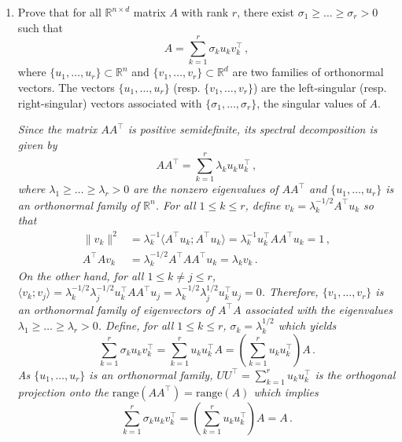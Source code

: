 \documentclass[a4paper,10pt,fleqn]{article}
\newcommand{\eqsp}{\,}
\newcommand{\rset}{\ensuremath{\mathbb{R}}}
\newcommand{\1}{\ensuremath{\mathbbm{1}}}
\newcommand{\bfU}{U}
\newcommand{\bfA}{A}
\newcommand{\bfV}{V}
\begin{document}
\begin{enumerate}
\item Prove that for all $\rset^{n \times d}$ matrix $\bfA$ with rank $r$, there exist $\sigma_1\geqslant \ldots \geqslant \sigma_r>0$ such that
$$
\bfA = \sum_{k=1}^r \sigma_k u_k v^\top_k\eqsp,
$$
where $\{u_1,\ldots,u_r\}\subset \rset^n$ and $\{v_1,\ldots,v_r \} \subset \rset^d$ are two families of orthonormal  vectors. The vectors $\{u_1,\ldots,u_r\}$  (resp. $\{v_1,\ldots,v_r\}$) are the left-singular (resp. right-singular) vectors associated with $\{\sigma_1,\ldots,\sigma_r\}$, the singular values of $\bfA$.

\vspace{.2cm}

{\em
Since the matrix $\bfA\bfA^\top$ is positive semidefinite, its spectral decomposition is given by
$$
\bfA\bfA^\top = \sum_{k=1}^r \lambda_k u_k u^\top_k\eqsp,
$$
where $\lambda_1\geqslant \ldots\geqslant \lambda_r>0$ are the nonzero eigenvalues of $\bfA\bfA^\top$ and $\{u_1,\ldots,u_r\}$ is an orthonormal family of $\rset^n$. For all $1\leqslant k\leqslant r$, define $v_k = \lambda_k^{-1/2}\bfA^\top u_k$ so that
\begin{align*}
\|v_k\|^2&=\lambda_k^{-1}\langle \bfA^\top u_k;\bfA^\top u_k\rangle = \lambda_k^{-1} u^\top_k\bfA\bfA^\top u_k = 1\eqsp, \\
\bfA^\top\bfA v_k & = \lambda_k^{-1/2}\bfA^\top \bfA \bfA^\top u_k  = \lambda_k v_k\eqsp.
\end{align*}
On the other hand, for all $1\leqslant k\neq j\leqslant r$, $\langle v_k;v_j\rangle = \lambda_k^{-1/2}\lambda_j^{-1/2}u^\top_k\bfA\bfA^\top u_j =\lambda_k^{-1/2}\lambda_j^{1/2}u_k^\top u_j = 0$. Therefore, $\{v_1,\ldots,v_r\}$ is an orthonormal family of eigenvectors of $\bfA^\top\bfA$ associated with the eigenvalues $\lambda_1\geqslant \ldots\geqslant \lambda_r>0$.
Define, for all $1\leqslant k\leqslant r$, $\sigma_k = \lambda_k^{1/2}$ which yields
$$
\sum_{k=1}^r \sigma_k u_k v^\top_k = \sum_{k=1}^r  u_k u^\top_k\bfA = \left(\sum_{k=1}^r  u_k u^\top_k\right)\bfA\eqsp.
$$
As $\{u_1,\ldots,u_r\}$ is an orthonormal family, $\bfU\bfU^\top = \sum_{k=1}^r u_ku^\top_k$ is the orthogonal projection onto the $\mathrm{range}(\bfA\bfA^\top) = \mathrm{range}(\bfA)$ which implies
$$
\sum_{k=1}^r \sigma_k u_k v^\top_k = \left(\sum_{k=1}^r  u_k u^\top_k\right)\bfA = \bfA\eqsp.
$$
}

\end{enumerate}
\end{document}
